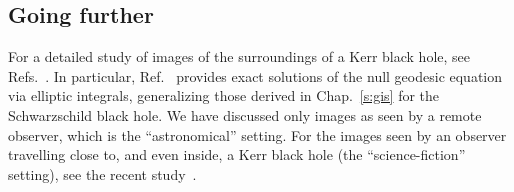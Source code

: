 \subsection{Going further}

For a detailed study of images of the surroundings of a Kerr black hole,
see Refs.~\cite{Dokuc19,DokucN19,DokucN20a,GrallL20a}. In particular, Ref.~\cite{GrallL20a}
provides exact solutions of the null geodesic equation via elliptic integrals,
generalizing those derived in Chap.~\ref{s:gis} for the Schwarzschild black hole.
We have discussed only images as seen by a remote observer, which is the ``astronomical'' setting.
For the images seen by an observer travelling close to, and even inside, a Kerr black hole
(the ``science-fiction'' setting), see the recent study~\cite{Riazu20}.


